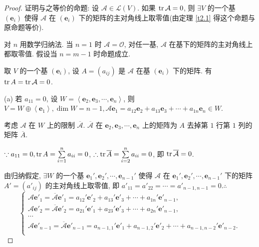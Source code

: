 \documentclass[color=black,device=normal,lang=cn,mode=geye]{elegantnote}
\begin{document}
\begin{proof}
    证明与之等价的命题: 设 $\mathcal{A}\in\mathcal{L}(V)$. 如果 $\operatorname{tr} \mathcal{A}=0$, 则 $\exists V$ 的一个基 $(\boldsymbol{e}_i)$ 使得 $\mathcal{A}$ 在 $(\boldsymbol{e}_i)$ 下的矩阵的主对角线上取零值(由定理 \ref{t2.1} 得这个命题与原命题等价).

    对 $n$ 用数学归纳法. 当 $n=1$ 时 $\mathcal{A}=\mathcal{O}$, 对任一基, $\mathcal{A}$ 在基下的矩阵的主对角线上都取零值. 假设当 $n=m-1$ 时命题成立.

    取 $V$ 的一个基 $(\boldsymbol{e}_i)$, 设 $A=(a_{ij})$ 是 $\mathcal{A}$ 在基 $(\boldsymbol{e}_i)$ 下的矩阵. 有 $\operatorname{tr} A=\operatorname{tr} \mathcal{A}=0$.

    (a) 若 $a_{11}=0$, 设 $W=\left<\boldsymbol{e}_2,\boldsymbol{e}_3,\cdots,\boldsymbol{e}_n\right>$, 则 $V=W\oplus\left<\boldsymbol{e}_1\right>,\dim W=n-1,\mathcal{A}\boldsymbol{e}_1=a_{12}\boldsymbol{e}_2+a_{13}\boldsymbol{e}_3+\cdots+a_{1n}\boldsymbol{e}_n\in W$.
    
    考虑 $\mathcal{A}$ 在 $W$ 上的限制 $\overline{\mathcal{A}}$. $\overline{\mathcal{A}}$ 在 $\boldsymbol{e}_2,\boldsymbol{e}_3,\cdots,\boldsymbol{e}_n$ 上的矩阵为 $A$ 去掉第 $1$ 行第 $1$ 列的矩阵 $\overline{A}$.
    
    $\because a_{11}=0,\operatorname{tr} A=\sum\limits_{i=1}^na_{ii}=0$, $\therefore\operatorname{tr} \overline{A}=\sum\limits_{i=2}^na_{ii}=0$, 即 $\operatorname{tr} \overline{\mathcal{A}}=0$.
    
    由归纳假定, $\exists W$ 的一个基 $\boldsymbol{e}_1',\boldsymbol{e}_2',\cdots,\boldsymbol{e}_{n-1}'$ 使得 $\mathcal{A}$ 在 $\boldsymbol{e}_1',\boldsymbol{e}_2',\cdots,\boldsymbol{e}_{n-1}'$ 下的矩阵 $A'=(a'_{ij})$ 的主对角线上取零值, 即 $a'_{11}=a'_{22}=\cdots=a'_{n-1,n-1}=0.\therefore$
    \[\begin{cases}
        \mathcal{A}\boldsymbol{e}'_1=\overline{\mathcal{A}}\boldsymbol{e}'_1=a_{12}'\boldsymbol{e}'_2+a_{13}'\boldsymbol{e}'_3+\cdots+a_{1n}'\boldsymbol{e}'_{n-1}, \\
        \mathcal{A}\boldsymbol{e}'_2=\overline{\mathcal{A}}\boldsymbol{e}'_2=a_{21}'\boldsymbol{e}'_1+a_{23}'\boldsymbol{e}'_3+\cdots+a_{2n}'\boldsymbol{e}'_{n-1}, \\
        \cdots \\
        \mathcal{A}\boldsymbol{e}'_{n-1}=\overline{\mathcal{A}}\boldsymbol{e}'_{n-1}=a_{n-1,1}'\boldsymbol{e}'_1+a_{n-1,2}'\boldsymbol{e}'_2+\cdots+a_{n-1,n-2}'\boldsymbol{e}'_{n-2}. \\
    \end{cases}\]
    

\end{proof}
\end{document}
